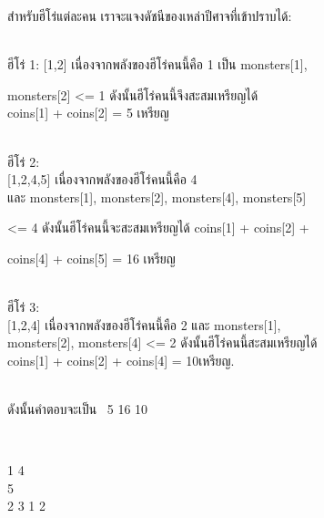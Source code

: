 \documentclass{article}
\begin{document}
{\begin{longtable}[]
\begin{minipage}[t]{\linewidth}
สำหรับฮีโร่แต่ละคน เราจะแจงดัชนีของเหล่าปีศาจที่เข้าปราบได้:\\

\strut \\

ฮีโร่ 1: {[}1,2{]} เนื่องจากพลังของฮีโร่คนนี้คือ 1 เป็น monsters{[}1{]},

monsters{[}2{]} \textless= 1 ดังนั้นฮีโร่คนนี้จึงสะสมเหรียญได้\\

coins{[}1{]} + coins{[}2{]} = 5 เหรียญ\\

\strut \\

ฮีโร่ 2:\\

{[}1,2,4,5{]} เนื่องจากพลังของฮีโร่คนนี้คือ 4\\

และ monsters{[}1{]}, monsters{[}2{]}, monsters{[}4{]}, monsters{[}5{]}

\textless= 4 ดังนั้นฮีโร่คนนี้จะสะสมเหรียญได้ coins{[}1{]} + coins{[}2{]} +

coins{[}4{]} + coins{[}5{]} = 16 เหรียญ\\

\strut \\

ฮีโร่ 3:\\

{[}1,2,4{]} เนื่องจากพลังของฮีโร่คนนี้คือ 2 และ monsters{[}1{]},\\

monsters{[}2{]}, monsters{[}4{]} \textless= 2 ดังนั้นฮีโร่คนนี้สะสมเหรียญได้\\

coins{[}1{]} + coins{[}2{]} + coins{[}4{]} = 10เหรียญ.\\

\strut \\

ดังนั้นคำตอบจะเป็น~ 5 16 10\\

\strut

\end{minipage} \\

\begin{minipage}[t]{\linewidth}\raggedright

1 4\\

5\\

2 3 1 2\\


\end{minipage}
\end{longtable}}
\end{document}

